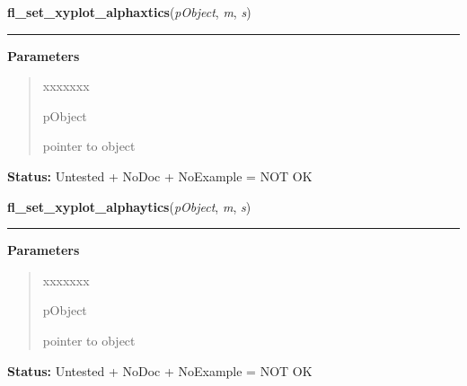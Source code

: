     \vspace{0.5ex}

\hspace{.8\funcindent}\begin{boxedminipage}{\funcwidth}

    \raggedright \textbf{fl\_set\_xyplot\_alphaxtics}(\textit{pObject}, \textit{m}, \textit{s})

    \vspace{-1.5ex}

    \rule{\textwidth}{0.5\fboxrule}
\setlength{\parskip}{2ex}
\setlength{\parskip}{1ex}
      \textbf{Parameters}
      \vspace{-1ex}

      \begin{quote}
        \begin{Ventry}{xxxxxxx}

          \item[pObject]

          pointer to object

        \end{Ventry}

      \end{quote}

\textbf{Status:} Untested + NoDoc + NoExample = NOT OK



    \end{boxedminipage}

    \label{xformslib:library:fl_set_xyplot_alphaytics}

    \vspace{0.5ex}

\hspace{.8\funcindent}\begin{boxedminipage}{\funcwidth}

    \raggedright \textbf{fl\_set\_xyplot\_alphaytics}(\textit{pObject}, \textit{m}, \textit{s})

    \vspace{-1.5ex}

    \rule{\textwidth}{0.5\fboxrule}
\setlength{\parskip}{2ex}
\setlength{\parskip}{1ex}
      \textbf{Parameters}
      \vspace{-1ex}

      \begin{quote}
        \begin{Ventry}{xxxxxxx}

          \item[pObject]

          pointer to object

        \end{Ventry}

      \end{quote}

\textbf{Status:} Untested + NoDoc + NoExample = NOT OK



    \end{boxedminipage}

